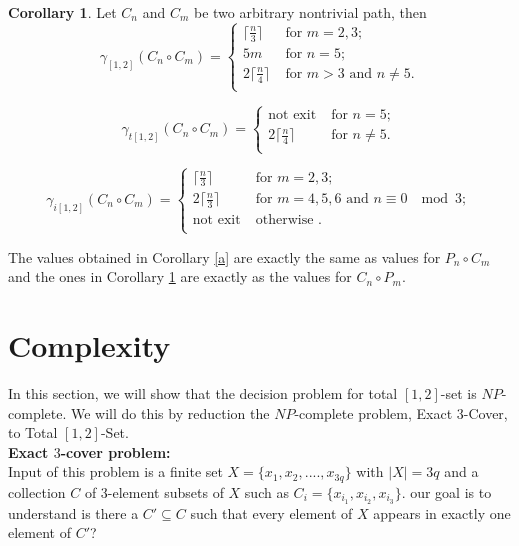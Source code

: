 \documentclass[A4,12pt]{article}
\theoremstyle{definition}
\newtheorem{corollary}[theorem]{Corollary}
\theoremstyle{remark}
\begin{document}
\begin{corollary}\label{b}
 Let $C_n$ and $C_m$ be two arbitrary nontrivial path, then
\begin{equation*}
\gamma_{[1, 2]}(C_n \circ C_m)  =\left\{
\begin{array}{ll}
\lceil \frac{n}{3}\rceil\; & \text{for } m=2,3;\\
5m& \text{for } n=5;\\
2\lceil \frac{n}{4}\rceil\; & \text{for } m>3 \text{ and } n\neq5 .\\
\end{array} \right.
\end{equation*}

\begin{equation*}
\gamma_{t[1, 2]}(C_n \circ C_m)  =\left\{
\begin{array}{ll}
\text{not exit} \; & \text{for } n=5;\\
2\lceil \frac{n}{4}\rceil\; & \text{for } n\neq 5.\\
\end{array} \right.
\end{equation*}

\begin{equation*}
\gamma_{i[1, 2]}(C_n \circ C_m)  =\left\{
\begin{array}{ll}
\lceil \frac{n}{3}\rceil\; & \text{for } m=2,3;\\
2\lceil \frac{n}{3}\rceil\; & \text{for } m=4,5,6 \text{ and } n\equiv 0\;\mod 3;\\
\text{not exit} \; & \text{otherwise } .\\
\end{array} \right.
\end{equation*}
\end{corollary}
The values obtained in Corollary \ref{a} are exactly the same as  values for $P_n \circ C_m$ and the ones in Corollary  \ref{b} are exactly as the  values for $C_n \circ P_m$.

\section{Complexity} \label{complextysec}

In this section, we will show that the decision problem for total $[1,2]$-set is $NP$-complete. We will do this  by reduction the $NP$-complete problem, Exact $3$-Cover, to Total $[1, 2]$-Set.\\


\textbf{Exact $3$-cover problem:}
\\
Input of this problem is a finite set $X=\{ x_1, x_2, .... , x_{3q} \}$ with $|X| = 3q$ and a collection $C$ of 3-element subsets of $X$ such as  $C_i =\{x_{i_1},x_{i_2},x_{i_3}\}$. our goal is to understand is there a $C'\subseteq C$ such that every element of $X$ appears in exactly one element of $C'$?\\
\end{document}
